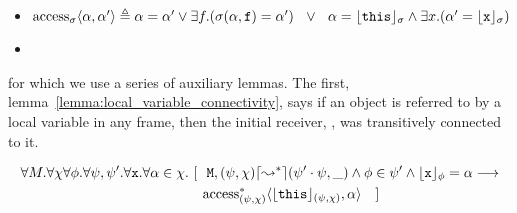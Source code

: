 \begin{definition}
\label{def:access_rel} 

\begin{itemize}
\item $\text{access}_{\sigma}\langle\alpha,\alpha'\rangle \triangleq \alpha = \alpha' \vee \exists f. (\sigma(\alpha, {\mbox{\tt{f}}}) = \alpha')\ \  \vee\ \  \alpha = {\lfloor{ {{\mbox{\tt{this}}}}}\rfloor_{\sigma}} \wedge \exists x. (\alpha' = {\lfloor{ {{\mbox{\tt{x}}}}}\rfloor_{\sigma}})$
\item {}
\end{itemize}
\end{definition}

\vspace{.01in}
for which we use a series of auxiliary lemmas. The first, lemma~\ref{lemma:local_variable_connectivity}, 
says   %
if an object is referred to by a local variable in any frame,
 then the initial receiver, , was transitively connected to it.

\begin{lemma}
\label{lemma:local_variable_connectivity}
\begin{align*}
\forall M. \forall \chi \forall \phi. \forall \psi,\psi'.\forall {\mbox{\tt{x}}}. \forall \alpha \in \chi. &\ [ \ \ {\mbox{\tt{\ensuremath{{\mbox{\tt{M}}}}}}},(\psi,\chi) \lceil\leadsto^*\rceil (\psi' \cdot \psi, \_) \wedge \phi \in \psi' \wedge {\ensuremath{\lfloor{ {{\mbox{\tt{x}}}}}\rfloor_{\phi}}} = \alpha \longrightarrow \\
&\quad \text{access}^*_{(\psi,\chi)}\langle {\ensuremath{\lfloor{ {{\mbox{\tt{this}}}}}\rfloor_{(\psi,\chi)}}}, \alpha\rangle\ \ \ ]
\end{align*}
\end{lemma}

